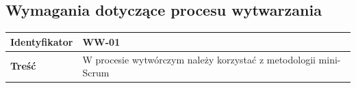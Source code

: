 \documentclass[11pt,oneside,a4paper,titlepage,onecolumn]{article}
\begin{document}
\subsection{Wymagania dotyczące procesu wytwarzania}

\begin{tabular}{ | l | l | }
	\hline
		\textbf{Identyfikator} & 
	WW-01
		\\
		
	\hline
		\textbf{Treść} & \parbox[t]{13cm}{
			W procesie wytwórczym należy korzystać z metodologii
			mini-Scrum
		}\\

	\hline
\end{tabular}
\end{document}
